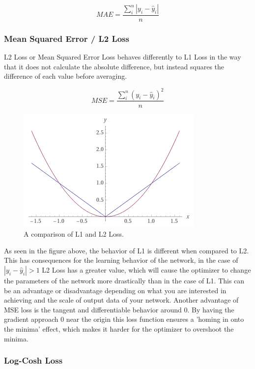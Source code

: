 \documentclass[a4paper,10pt]{scrartcl}
\begin{document}
\begin{equation}
    MAE = \frac{\sum_i^n |y_i - \hat{y}_i|}{n}
\end{equation}

\subsubsection*{Mean Squared Error / L2 Loss}

L2 Loss or Mean Squared Error Loss behaves differently to L1 Loss in the way that it does not calculate the absolute difference, but instead squares the difference of each value before averaging.

\begin{equation}
    MSE = \frac{\sum_i^n (y_i - \hat{y}_i)^2}{n}
\end{equation}

\begin{figure}[h]
    \includegraphics[scale=0.5]{images/l1l2loss.png}
    \centering
    \caption{A comparison of L1 and L2 Loss.}
\end{figure}

As seen in the figure above, the behavior of L1 is different when compared to L2.
This has consequences for the learning behavior of the network, in the case of $|y_i - \hat{y}_i| > 1$ L2 Loss has a greater value, which will cause the optimizer to change the parameters of the network more drastically than in the case of L1.
This can be an advantage or disadvantage depending on what you are interested in achieving and the scale of output data of your network.
Another advantage of MSE loss is the tangent and differentiable behavior around 0.
By having the gradient approach 0 near the origin this loss function ensures a 'homing in onto the minima' effect, which makes it harder for the optimizer to overshoot the minima.

\subsubsection*{Log-Cosh Loss}
\end{document}
